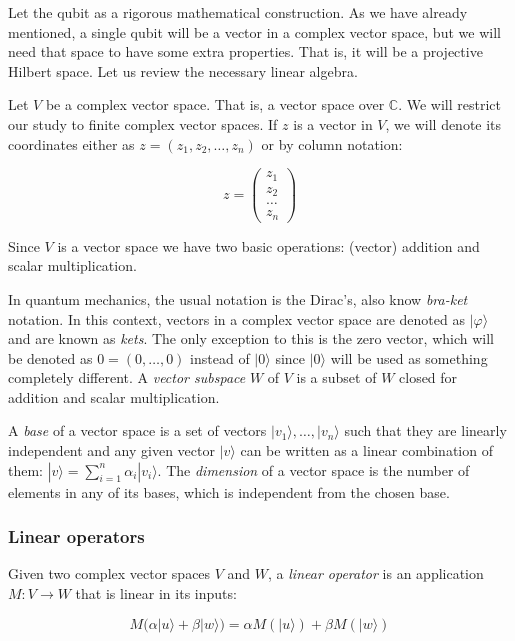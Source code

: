 Let the qubit as a rigorous mathematical construction. As we have already mentioned, a single qubit will be a vector in a complex vector space, but we will need that space to have some extra properties. That is, it will be a projective Hilbert space. Let us review the necessary linear algebra.

Let $V$ be a complex vector space. That is, a vector space over $\mathds{C}$. We will restrict our study to finite complex vector spaces. If $z$ is a vector in $V$, we will denote its coordinates either as $z = (z_1, z_2, \dotsc, z_n)$ or by column notation:

$$ z = 
\begin{pmatrix}
	z_1\\
	z_2 \\
	\dotsc \\
	z_n
\end{pmatrix}
$$

Since $V$ is a vector space we have two basic operations: (vector) addition and scalar multiplication.

In quantum mechanics, the usual notation is the Dirac's, also know \emph{bra-ket} notation. In this context, vectors in a complex vector space are denoted as $|\varphi\rangle$ and are known as \emph{kets}. The only exception to this is the zero vector, which will be denoted as $0 = (0, \dotsc, 0)$ instead of $|0\rangle$ since $|0\rangle$ will be used as something completely different. A \emph{vector subspace} $W$ of $V$ is a subset of $W$ closed for addition and scalar multiplication.

A \emph{base} of a vector space is a set of vectors $|v_1\rangle, \dotsc, |v_n\rangle$ such that they are linearly independent and any given vector $|v\rangle$ can be written as a linear combination of them: $|v\rangle = \sum_{i=1}^n \alpha_i|v_i\rangle$. The \emph{dimension} of a vector space is the number of elements in any of its bases, which is independent from the chosen base.

\subsubsection{Linear operators}

\begin{definition}
	Given two complex vector spaces $V$ and $W$, a \emph{linear operator} is an application $M: V \rightarrow W $ that is linear in its inputs:
	
	$$ M \Big( \alpha |u\rangle + \beta |w\rangle \Big) = \alpha M (|u\rangle) + \beta M (|w\rangle) $$
\end{definition}

